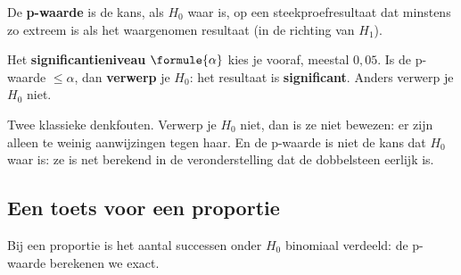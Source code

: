 \begin{theorie}
De \textbf{\textcolor{accent}{p-waarde}} is de kans, als $H_0$ waar is, op een steekproefresultaat dat minstens zo extreem is als het waargenomen resultaat (in de richting van $H_1$).

\vspace{1mm}
Het \textbf{\textcolor{accent}{significantieniveau}} $\formule{\alpha}$ kies je vooraf, meestal $0{,}05$. Is de p-waarde $\leqslant \alpha$, dan \textbf{\textcolor{accent}{verwerp}} je $H_0$: het resultaat is \textbf{\textcolor{accent}{significant}}. Anders verwerp je $H_0$ niet.
\end{theorie}


Twee klassieke denkfouten. Verwerp je $H_0$ niet, dan is ze niet bewezen: er zijn alleen te weinig aanwijzingen tegen haar. En de p-waarde is niet de kans dat $H_0$ waar is: ze is net berekend in de veronderstelling dat de dobbelsteen eerlijk is.

\begin{oefeningen}
\end{oefeningen}

\subsection{Een toets voor een proportie}

Bij een proportie is het aantal successen onder $H_0$ binomiaal verdeeld: de p-waarde berekenen we exact.

